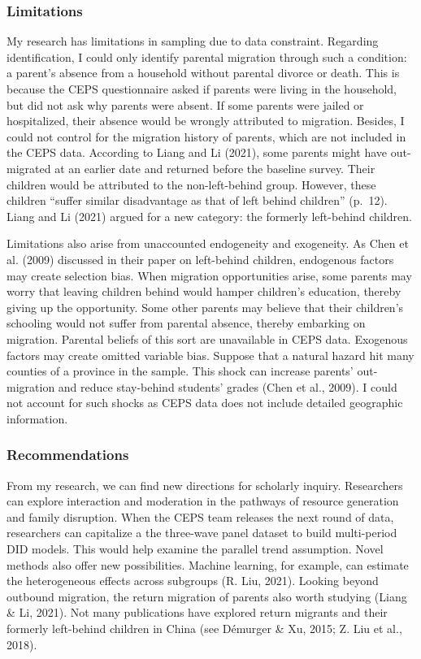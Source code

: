 \documentclass[
  man]{apa7}
\begin{document}
\hypertarget{limitations}{%
\subsubsection{Limitations}\label{limitations}}

My research has limitations in sampling due to data constraint. Regarding identification, I could only identify parental migration through such a condition: a parent's absence from a household without parental divorce or death. This is because the CEPS questionnaire asked if parents were living in the household, but did not ask why parents were absent. If some parents were jailed or hospitalized, their absence would be wrongly attributed to migration. Besides, I could not control for the migration history of parents, which are not included in the CEPS data. According to Liang and Li (2021), some parents might have out-migrated at an earlier date and returned before the baseline survey. Their children would be attributed to the non-left-behind group. However, these children ``suffer similar disadvantage as that of left behind children'' (p.~12). Liang and Li (2021) argued for a new category: the formerly left-behind children.

Limitations also arise from unaccounted endogeneity and exogeneity. As Chen et al. (2009) discussed in their paper on left-behind children, endogenous factors may create selection bias. When migration opportunities arise, some parents may worry that leaving children behind would hamper children's education, thereby giving up the opportunity. Some other parents may believe that their children's schooling would not suffer from parental absence, thereby embarking on migration. Parental beliefs of this sort are unavailable in CEPS data. Exogenous factors may create omitted variable bias. Suppose that a natural hazard hit many counties of a province in the sample. This shock can increase parents' out-migration and reduce stay-behind students' grades (Chen et al., 2009). I could not account for such shocks as CEPS data does not include detailed geographic information.

\hypertarget{recommendations}{%
\subsubsection{Recommendations}\label{recommendations}}

From my research, we can find new directions for scholarly inquiry. Researchers can explore interaction and moderation in the pathways of resource generation and family disruption. When the CEPS team releases the next round of data, researchers can capitalize a the three-wave panel dataset to build multi-period DID models. This would help examine the parallel trend assumption. Novel methods also offer new possibilities. Machine learning, for example, can estimate the heterogeneous effects across subgroups (R. Liu, 2021). Looking beyond outbound migration, the return migration of parents also worth studying (Liang \& Li, 2021). Not many publications have explored return migrants and their formerly left-behind children in China (see Démurger \& Xu, 2015; Z. Liu et al., 2018).
\end{document}
